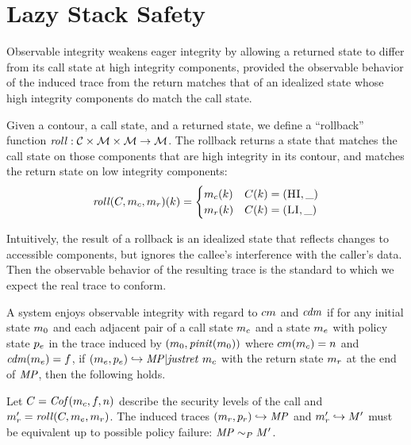\documentclass[acmsmall,review,anonymous]{acmart}\settopmatter{printfolios=true,printccs=false,printacmref=false}
\begin{document}
\section{Lazy Stack Safety}


      Observable integrity weakens eager integrity by allowing a returned state
      to differ from its call state at high integrity components, provided the
      observable behavior of the induced trace from the return matches that of
      an idealized state whose high integrity components do match the call
      state.

      Given a contour, a call state, and a returned state, we define a
      ``rollback'' function \(\mathit{roll} : {\mathcal C} \times {\mathcal M} \times
      {\mathcal M} \rightarrow {\mathcal M}\). The rollback returns a state that matches
      the call state on those components that are high integrity in its
      contour, and matches the return state on low integrity components:
      \[\mathit{roll}(C,m_c,m_r)(k) =
      \begin{cases}
        m_c(k) & C(k) = (\textsc{HI},\_) \\
        m_r(k) & C(k) = (\textsc{LI},\_) \\
      \end{cases}\]

      Intuitively, the result of a rollback is an idealized state that
      reflects changes to accessible components, but ignores the callee's
      interference with the caller's data. Then the observable behavior of the
      resulting trace is the standard to which we expect the real trace to
      conform.

      A system enjoys observable integrity with regard to \(cm\) and 
      \(\mathit{cdm}\) if for any initial state \(m_0\) and each adjacent pair
      of a call state \(m_c\) and a state \(m_e\) with policy state
      \(p_e\) in the trace induced by
      \((m_0,\mathit{pinit}(m_0))\) where
      \(cm(m_c) = n\) and \(\mathit{cdm}(m_e) = f\),
      if \((m_e,p_e) \hookrightarrow \mathit{MP} | \mathit{justret}\ m_c\)
      with the return state \(m_r\) at the end of \(\mathit{MP}\), then the
      following holds.

      Let \(C = \mathit{Cof}(m_c,f,n)\) describe the security
      levels of the call and
      \(m_r' = \mathit{roll}(C,m_e,m_r)\). The induced
      traces \((m_r,p_r) \hookrightarrow \mathit{MP}\) and
      \(m_r' \hookrightarrow M'\) must be equivalent up to
      possible policy failure: \(\mathit{MP} \sim_P M'\).
\end{document}
